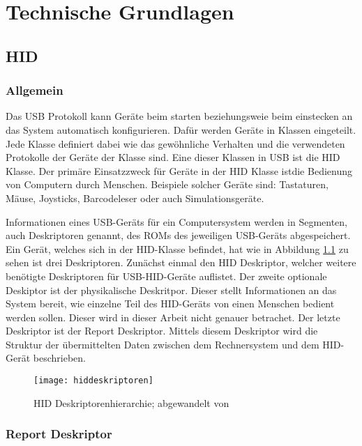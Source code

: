 
\chapter{Technische Grundlagen}

\section{\acf{HID}}

\subsection{Allgemein}
Das USB Protokoll kann Geräte beim starten beziehungsweie beim einstecken an das System automatisch konfigurieren. Dafür werden Geräte in Klassen eingeteilt. Jede Klasse definiert dabei wie das gewöhnliche Verhalten und die verwendeten Protokolle der Geräte der Klasse sind. Eine dieser Klassen in USB ist die \ac{HID} Klasse. Der primäre Einsatzzweck für Geräte in der \acs{HID} Klasse istdie Bedienung von Computern durch Menschen. Beispiele solcher Geräte sind: Tastaturen, Mäuse, Joysticks, Barcodeleser oder auch Simulationsgeräte. \cite[S.~1f.]{usbHIDS}

Informationen eines USB-Geräts für ein Computersystem werden in Segmenten, auch Deskriptoren genannt, des ROMs des jeweiligen USB-Geräts abgespeichert. Ein Gerät, welches sich in der \acs{HID}-Klasse befindet, hat wie in Abbildung \ref{fig:hiddeskriptoren} zu sehen ist drei Deskriptoren. Zunächst einmal den \acs{HID} Deskriptor, welcher weitere benötigte Deskriptoren für USB-\acs{HID}-Geräte auflistet. Der zweite optionale Deskiptor ist der physikalische Deskritpor. Dieser stellt Informationen an das System bereit, wie einzelne Teil des \acs{HID}-Geräts von einen Menschen bedient werden sollen. Dieser wird in dieser Arbeit nicht genauer betrachet. Der letzte Deskriptor ist der Report Deskriptor. Mittels diesem Deskriptor wird die Struktur der übermittelten Daten zwischen dem Rechnersystem und dem \acs{HID}-Gerät beschrieben. \cite[S.~4f.]{usbHIDS}

\begin{figure}[h]
    \centering
    \texttt{[image: hiddeskriptoren]}
    \caption{\acs{HID} Deskriptorenhierarchie; abgewandelt von \cite[S.~4]{usbHIDS}}
    \label{fig:hiddeskriptoren}
\end{figure}

\subsection{Report Deskriptor}

